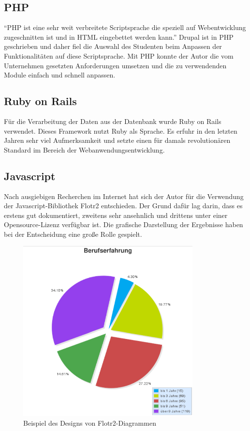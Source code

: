 \subsection{PHP}
``PHP ist eine sehr weit verbreitete Scriptsprache die speziell auf Webentwicklung zugeschnitten ist und in HTML eingebettet werden kann.''\citep{PHP}
Drupal ist in PHP geschrieben und daher fiel die Auswahl des Studenten beim Anpassen der Funktionalitäten auf diese Scriptsprache. Mit PHP konnte der Autor die vom Unternehmen gesetzten Anforderungen umsetzen und die zu verwendenden Module einfach und schnell anpassen.
\subsection{Ruby on Rails}
Für die Verarbeitung der Daten aus der Datenbank wurde Ruby on Rails verwendet. 
Dieses Framework nutzt Ruby als Sprache. Es erfuhr in den letzten Jahren sehr viel Aufmerksamkeit und setzte einen für damals revolutionären Standard im Bereich der Webanwendungsentwicklung.\citep{graver}
\subsection{Javascript}
Nach ausgiebigen Recherchen im Internet hat sich der Autor für die Verwendung der Javascript-Bibliothek Flotr2 entschieden. Der Grund dafür lag darin, dass es erstens gut dokumentiert,  zweitens sehr ansehnlich und drittens unter einer Opensource-Lizenz verfügbar ist. Die grafische Darstellung der Ergebnisse haben bei der Entscheidung eine große Rolle gespielt.
\begin{figure}[htbp]
 \centering
 \includegraphics[width=350px]{./material/pie_chart.png}
 \caption{Beispiel des Designs von Flotr2-Diagrammen}
 \label{fig:pie_chart_flotr}
\end{figure}

